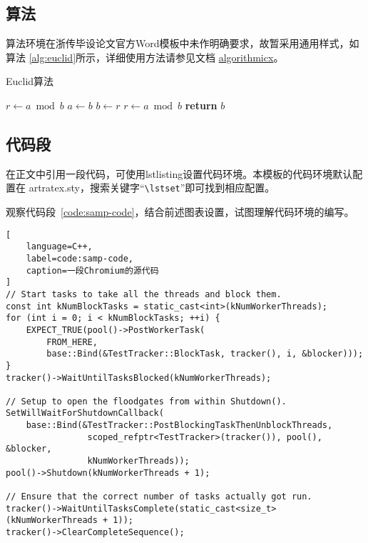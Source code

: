 \subsection{算法}\label{sub:algorithms}

算法环境在浙传毕设论文官方Word模板中未作明确要求，故暂采用通用样式，如算法
\ref{alg:euclid}所示，详细使用方法请参见文档
\href{https://ctan.org/pkg/algorithmicx?lang=en}{algorithmicx}。

\begin{algorithm}[!htbp]
    \small
    \caption{Euclid算法}\label{alg:euclid}
    \begin{algorithmic}[1]
        \State $r\gets a\bmod b$
        \State $a\gets b$
        \State $b\gets r$
        \State $r\gets a\bmod b$
        \EndWhile\label{euclidendwhile}
        \State \textbf{return} $b$
        \EndProcedure
    \end{algorithmic}
\end{algorithm}

\subsection{代码段}\label{sub:listings}

在正文中引用一段代码，可使用lstlisting设置代码环境。本模板的代码环境默认配置在
artratex.sty，搜索关键字“\verb|\lstset|”即可找到相应配置。

观察代码段~\ref{code:samp-code}，结合前述图表设置，试图理解代码环境的编写。

\begin{lstlisting}[
    language=C++,
    label=code:samp-code,
    caption=一段Chromium的源代码
]
// Start tasks to take all the threads and block them.
const int kNumBlockTasks = static_cast<int>(kNumWorkerThreads);
for (int i = 0; i < kNumBlockTasks; ++i) {
    EXPECT_TRUE(pool()->PostWorkerTask(
        FROM_HERE,
        base::Bind(&TestTracker::BlockTask, tracker(), i, &blocker)));
}
tracker()->WaitUntilTasksBlocked(kNumWorkerThreads);

// Setup to open the floodgates from within Shutdown().
SetWillWaitForShutdownCallback(
    base::Bind(&TestTracker::PostBlockingTaskThenUnblockThreads,
                scoped_refptr<TestTracker>(tracker()), pool(), &blocker,
                kNumWorkerThreads));
pool()->Shutdown(kNumWorkerThreads + 1);

// Ensure that the correct number of tasks actually got run.
tracker()->WaitUntilTasksComplete(static_cast<size_t>(kNumWorkerThreads + 1));
tracker()->ClearCompleteSequence();
\end{lstlisting}

